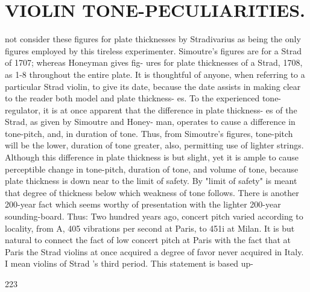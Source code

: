 \documentclass{article}
\begin{document}
\section*{VIOLIN TONE-PECULIARITIES.}
not consider these figures for plate thicknesses by Stradivarius as being the only figures employed by this tireless experimenter. Simoutre's figures are for a Strad of 1707; whereas Honeyman gives fig- ures for plate thicknesses of a Strad, 1708, as 1-8 throughout the entire plate. It is thoughtful of anyone, when referring to a particular Strad violin, to give its date, because the date assists in making clear to the reader both model and plate thickness- es. To the experienced tone-regulator, it is at once apparent that the difference in plate thickness- es of the Strad, as given by Simoutre and Honey- man, operates to cause a difference in tone-pitch, and, in duration of tone. Thus, from Simoutre's figures, tone-pitch will be the lower, duration of tone greater, also, permitting use of lighter strings. Although this difference in plate thickness is but slight, yet it is ample to cause perceptible change in tone-pitch, duration of tone, and volume of tone, because plate thickness is down near to the limit of safety. By "limit of safety" is meant that degree of thickness below which weakness of tone follows. There is another 200-year fact which seems worthy of presentation with the lighter 200-year sounding-board. Thus: Two hundred years ago, concert pitch varied according to locality, from A, 405 vibrations per second at Paris, to 451i at Milan. It is but natural to connect the fact of low concert pitch at Paris with the fact that at Paris the Strad violins at once acquired a degree of favor never acquired in Italy. I mean violins of Strad 's third period. This statement is based up-

223
\end{document}
